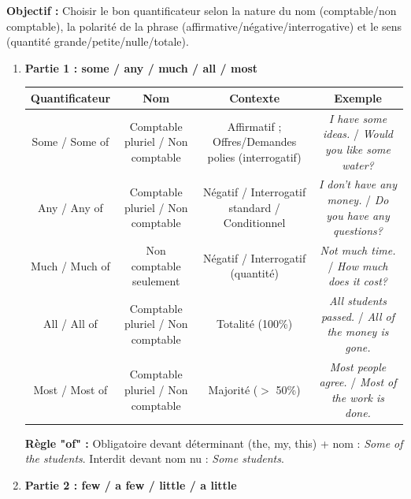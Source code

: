 \documentclass[11pt]{article}
\newcommand{\cle}[1]{{\popxbold\color{popdark}#1}}
\begin{document}
\begin{methode}
    \textbf{Objectif :} Choisir le bon quantificateur selon la nature du nom (comptable/non comptable), la polarité de la phrase (affirmative/négative/interrogative) et le sens (quantité grande/petite/nulle/totale).
    \begin{enumerate}
        \item \textbf{Partie 1 : \cle{some} / \cle{any} / \cle{much} / \cle{all} / \cle{most}}
              \begin{center}
                  \begin{tabular}{|c|c|c|c|}\hline
                  \textbf{Quantificateur} & \textbf{Nom} & \textbf{Contexte} & \textbf{Exemple} \\ \hline
                  \cle{Some} / \cle{Some of} & Comptable pluriel / Non comptable & Affirmatif ; Offres/Demandes polies (interrogatif) & \emph{I have \cle{some} ideas.} / \emph{Would you like \cle{some} water?} \\ \hline
                  \cle{Any} / \cle{Any of} & Comptable pluriel / Non comptable & Négatif / Interrogatif standard / Conditionnel & \emph{I don't have \cle{any} money.} / \emph{Do you have \cle{any} questions?} \\ \hline
                  \cle{Much} / \cle{Much of} & Non comptable seulement & Négatif / Interrogatif (quantité) & \emph{Not \cle{much} time.} / \emph{How \cle{much} does it cost?} \\ \hline
                  \cle{All} / \cle{All of} & Comptable pluriel / Non comptable & Totalité (100\%) & \emph{\cle{All} students passed.} / \emph{\cle{All of} the money is gone.} \\ \hline
                  \cle{Most} / \cle{Most of} & Comptable pluriel / Non comptable & Majorité ($>$ 50\%) & \emph{\cle{Most} people agree.} / \emph{\cle{Most of} the work is done.} \\ \hline
                  \end{tabular}
              \end{center}
              \textbf{Règle "of" :} Obligatoire devant déterminant (the, my, this) + nom : \emph{Some \cle{of the} students}. Interdit devant nom nu : \emph{Some students}.
        \item \textbf{Partie 2 : \cle{few} / \cle{a few} / \cle{little} / \cle{a little}}
              \begin{center}
                  \begin{tabular}{|c|c|c|}\hline

\end{tabular}
\end{center}
\end{enumerate}
\end{methode}
\end{document}
